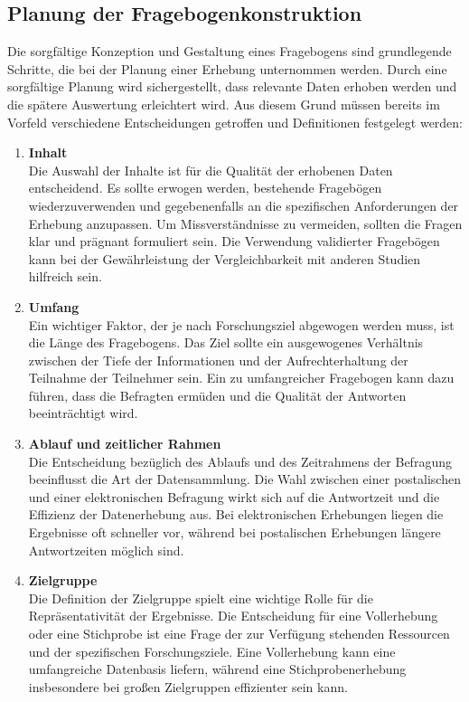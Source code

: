 \subsection{Planung der Fragebogenkonstruktion}
Die sorgfältige Konzeption und Gestaltung eines Fragebogens sind grundlegende Schritte, die bei der Planung einer Erhebung unternommen werden.
Durch eine sorgfältige Planung wird sichergestellt, dass relevante Daten erhoben werden und die spätere Auswertung erleichtert wird.
Aus diesem Grund müssen bereits im Vorfeld verschiedene Entscheidungen getroffen und Definitionen festgelegt werden:

\begin{enumerate}

    \item \textbf{Inhalt}\\
    Die Auswahl der Inhalte ist für die Qualität der erhobenen Daten entscheidend. Es sollte erwogen werden, bestehende
    Fragebögen wiederzuverwenden und gegebenenfalls an die spezifischen Anforderungen der Erhebung anzupassen. Um Missverständnisse
    zu vermeiden, sollten die Fragen klar und prägnant formuliert sein. Die Verwendung validierter Fragebögen kann bei der
    Gewährleistung der Vergleichbarkeit mit anderen Studien hilfreich sein.

    \item \textbf{Umfang}\\
    Ein wichtiger Faktor, der je nach Forschungsziel abgewogen werden muss, ist die Länge des Fragebogens. Das Ziel sollte
    ein ausgewogenes Verhältnis zwischen der Tiefe der Informationen und der Aufrechterhaltung der Teilnahme der Teilnehmer
    sein. Ein zu umfangreicher Fragebogen kann dazu führen, dass die Befragten ermüden und die Qualität der Antworten
    beeinträchtigt wird.

    \item \textbf{Ablauf und zeitlicher Rahmen}\\
    Die Entscheidung bezüglich des Ablaufs und des Zeitrahmens der Befragung beeinflusst die Art der Datensammlung. Die
    Wahl zwischen einer postalischen und einer elektronischen Befragung wirkt sich auf die Antwortzeit und die Effizienz
    der Datenerhebung aus. Bei elektronischen Erhebungen liegen die Ergebnisse oft schneller vor, während bei postalischen
    Erhebungen längere Antwortzeiten möglich sind.

    \item \textbf{Zielgruppe}\\
    Die Definition der Zielgruppe spielt eine wichtige Rolle für die Repräsentativität der Ergebnisse. Die Entscheidung
    für eine Vollerhebung oder eine Stichprobe ist eine Frage der zur Verfügung stehenden Ressourcen und der spezifischen
    Forschungsziele. Eine Vollerhebung kann eine umfangreiche Datenbasis liefern, während eine Stichprobenerhebung
    insbesondere bei großen Zielgruppen effizienter sein kann.


\end{enumerate}
